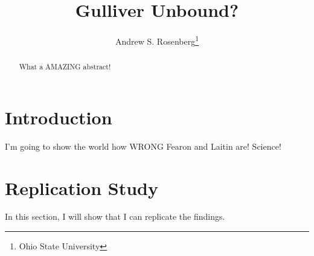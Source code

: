 \documentclass[12pt]{article}\usepackage[]{graphicx}\usepackage[]{color}
\begin{document}
\title{Gulliver Unbound?}

\author{Andrew S. Rosenberg\thanks{Ohio State University}}

\maketitle

\begin{abstract} \noindent
What a AMAZING abstract!
\end{abstract}

\thispagestyle{empty}

\newpage
\setcounter{page}{1}
\doublespacing

\section*{Introduction}
I'm going to show the world how WRONG Fearon and Laitin are! Science!

\section*{Replication Study}
In this section, I will show that I can replicate the findings.
\end{document}

